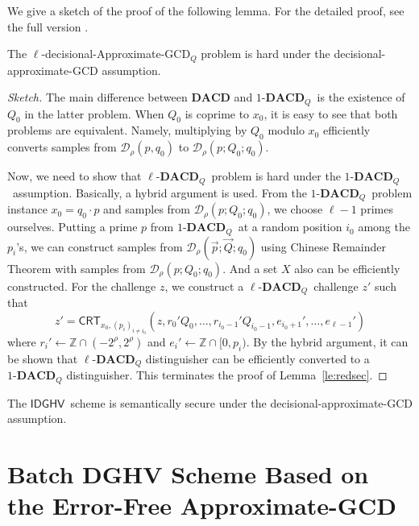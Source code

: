 \documentclass[11pt]{llncs}
\newcommand{\Z}{{\mathbb Z}}
\newcommand*{\crt}{\ensuremath{\mathsf{CRT}}}
\newcommand*{\CDGHV}{\ensuremath{\mathsf{IDGHV}}}
\newcommand*{\lDACD}{\ensuremath{\ell\textbf{-}\mathbf{DACD}_Q}}
\newcommand*{\DACD}{\ensuremath{1\textbf{-}\mathbf{DACD}_Q}}
\newcommand*\D{\ensuremath{\mathcal D}}
\begin{document}
We give a sketch of the proof of the following lemma. For the detailed proof, see the full version \cite{KLYC2013}. 
\begin{lemma}
\label{le:redsec}
The $\ell$-decisional-Approximate-GCD$_Q$ problem is hard under the
decisional-approximate-GCD assumption.
\end{lemma}
\begin{proof}[Sketch] The main difference between $\mathbf{DACD}$ and \DACD\  is the existence of $Q_0$ in the latter problem. When $Q_0$ is coprime to $x_0$, it is easy to see that both problems are equivalent. Namely, multiplying by $Q_0$ modulo $x_0$ efficiently converts samples from $\D_\rho(p,q_0)$ to $\D_\rho(p; Q_0; q_0)$. 

Now, we need to show that \lDACD\ problem is hard under the \DACD\ assumption. Basically, a hybrid argument is used. From the \DACD\ problem instance $x_0=q_0\cdot p$ and samples from $\D_\rho(p; Q_0; q_0)$, we choose $\ell-1$ primes ourselves. Putting a prime $p$ from \DACD\ at a random position $i_0$ among the $p_i$'s, we can construct samples from $\D_{\rho}(\vec{p};\vec{Q};q_0)$ using Chinese Remainder Theorem with samples from $\D_\rho(p; Q_0; q_0)$. And a set $X$ also can be efficiently constructed. For the challenge $z$, we construct a \lDACD\  challenge $z'$ such that 
\begin{equation*}
z'=\crt_{x_0,(p_i)_{i\neq i_0}}(z,r_{0}'Q_0,\dots,r_{i_0-1}'Q_{i_0-1},e_{i_0+1}',\dots,e_{\ell-1}') 
\end{equation*}
where $r_i'\gets\Z\cap (-2^\rho,2^\rho)$ and $e_i'\gets\Z\cap[0,p_i)$. By the hybrid argument, it can be shown that $\lDACD$ distinguisher can be efficiently converted to a $\DACD$ distinguisher. This terminates the proof of Lemma~\ref{le:redsec}.

\end{proof}
\begin{corollary}
The \CDGHV \ scheme is semantically secure under the
decisional-approximate-GCD assumption.
\end{corollary}

\section{Batch DGHV Scheme Based on the Error-Free Approximate-GCD}\label{sec:batch-error-free}
\end{document}
